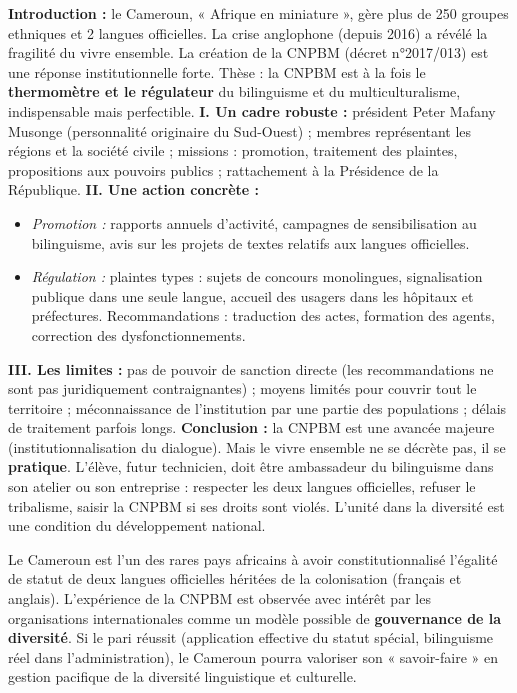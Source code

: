 \documentclass[11pt]{article}
\begin{document}
\begin{corrige}
\textbf{Introduction :} le Cameroun, « Afrique en miniature », gère plus de 250 groupes ethniques et 2 langues officielles. La crise anglophone (depuis 2016) a révélé la fragilité du vivre ensemble. La création de la CNPBM (décret n°2017/013) est une réponse institutionnelle forte. Thèse : la CNPBM est à la fois le \textbf{thermomètre et le régulateur} du bilinguisme et du multiculturalisme, indispensable mais perfectible.
\textbf{I. Un cadre robuste :} président Peter Mafany Musonge (personnalité originaire du Sud-Ouest) ; membres représentant les régions et la société civile ; missions : promotion, traitement des plaintes, propositions aux pouvoirs publics ; rattachement à la Présidence de la République.
\textbf{II. Une action concrète :}
\begin{itemize}
    \item \textit{Promotion :} rapports annuels d'activité, campagnes de sensibilisation au bilinguisme, avis sur les projets de textes relatifs aux langues officielles.
    \item \textit{Régulation :} plaintes types : sujets de concours monolingues, signalisation publique dans une seule langue, accueil des usagers dans les hôpitaux et préfectures. Recommandations : traduction des actes, formation des agents, correction des dysfonctionnements.
\end{itemize}
\textbf{III. Les limites :} pas de pouvoir de sanction directe (les recommandations ne sont pas juridiquement contraignantes) ; moyens limités pour couvrir tout le territoire ; méconnaissance de l'institution par une partie des populations ; délais de traitement parfois longs.
\textbf{Conclusion :} la CNPBM est une avancée majeure (institutionnalisation du dialogue). Mais le vivre ensemble ne se décrète pas, il se \textbf{pratique}. L'élève, futur technicien, doit être ambassadeur du bilinguisme dans son atelier ou son entreprise : respecter les deux langues officielles, refuser le tribalisme, saisir la CNPBM si ses droits sont violés. L'unité dans la diversité est une condition du développement national.
\end{corrige}

\begin{savaistu}
Le Cameroun est l'un des rares pays africains à avoir constitutionnalisé l'égalité de statut de deux langues officielles héritées de la colonisation (français et anglais). L'expérience de la CNPBM est observée avec intérêt par les organisations internationales comme un modèle possible de \textbf{gouvernance de la diversité}. Si le pari réussit (application effective du statut spécial, bilinguisme réel dans l'administration), le Cameroun pourra valoriser son « savoir-faire » en gestion pacifique de la diversité linguistique et culturelle.
\end{savaistu}
\end{document}

